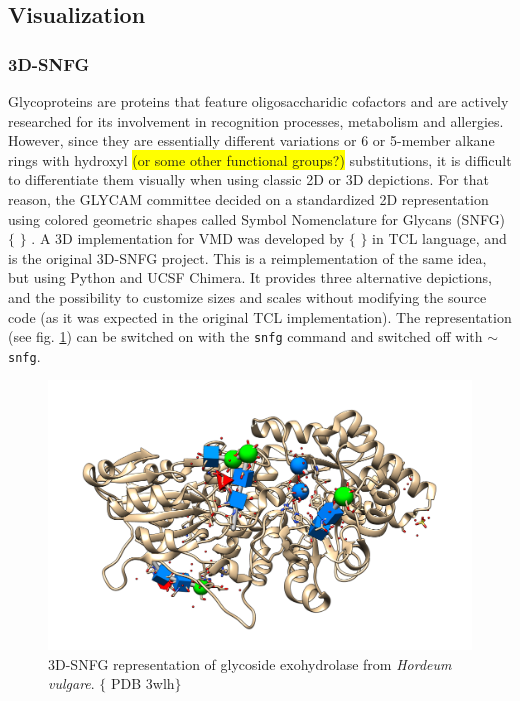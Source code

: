 \subsection{Visualization}
\subsubsection{3D-SNFG}
Glycoproteins are proteins that feature oligosaccharidic cofactors and are actively researched for its involvement in recognition processes, metabolism and allergies. However, since they are essentially different variations or 6 or 5-member alkane rings with hydroxyl \colorbox{yellow}{(or some other functional groups?)} substitutions, it is difficult to differentiate them visually when using classic 2D or 3D depictions. For that reason, the GLYCAM committee decided on a standardized 2D representation using colored geometric shapes called Symbol Nomenclature for Glycans (SNFG) $ \{ $ $ \} $ . A 3D implementation for VMD was developed by $ \{ $ $ \} $  in TCL language, and is the original 3D-SNFG project. This is a reimplementation of the same idea, but using Python and UCSF Chimera. It provides three alternative depictions, and the possibility to customize sizes and scales without modifying the source code (as it was expected in the original TCL implementation). The representation (see fig. \ref{fig:tangram-snfg}) can be switched on with the \texttt{snfg} command and switched off with \texttt{$ \sim $ snfg}.



\begin{figure}[H]
	\begin{Center}
		\includegraphics[width=\textwidth]{./figures/05/tangram_snfg.png}
	\end{Center}
	\cprotect\caption[Tangram 3D-SNFG]{3D-SNFG representation of glycoside exohydrolase from \textit{Hordeum vulgare}. $ \{ $ PDB 3wlh$ \} $}
	\label{fig:tangram-snfg}
\end{figure}


